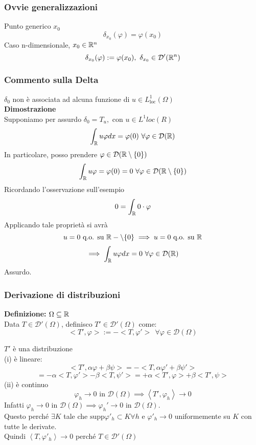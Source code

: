 \subsubsection{Ovvie generalizzazioni}
Punto generico $x_0$
\[\delta_{x_0}(\varphi)=\varphi(x_0)\]
Caso n-dimensionale, $x_0\in \mathbb{R}^n$
\[\delta_{x_0}(\varphi):=\varphi(x_0),\ \delta_{x_0}\in \mathcal D'(\R^n)\]
\subsubsection{Commento sulla Delta}
$\delta_0$ non è associata ad alcuna funzione di $u\in L^1_{\text{loc}}(\Omega)$
\\\textbf{Dimostrazione} 
\\Supponiamo per assurdo $\delta_0=T_u,$ con $u\in L^1loc(R)$
\[\int_{\R}^{} u\varphi dx=\varphi(0)\ \forall \varphi \in \mathcal D(\R)\]
In particolare, posso prendere $\varphi \in \mathcal D(\mathbb{R} \setminus \{0\} )$ 
\[\int_{\mathbb{R}}^{} u\varphi=\varphi(0)=0\ \forall \varphi\in\mathcal D(\mathbb{R}\setminus \{ 0\} )\]
Ricordando l'osservazione sull'esempio 
\[0=\int_{\mathbb{R}}^{} 0\cdot \varphi\]
Applicando tale proprietà si avrà
\[u=0\text{ q.o. su }\mathbb{R}-\setminus \{ 0\} \implies u=0\text{ q.o. su }\mathbb{R}\]
\[\implies \int_{\mathbb{R}}^{} u\varphi dx=0\ \forall \varphi \in \mathcal D(\mathbb{R})\]
Assurdo.
\subsubsection{Derivazione di distribuzioni}
\begin{tcolorbox}
\textbf{Definizione: }$\Omega \subseteq  \mathbb{R}$
\\Data $T\in \mathcal D'(\Omega)$, definisco $T' \in \mathcal D'(\Omega)$ come:
\[<T', \varphi>:=- <T,\varphi'>\ \ \forall \varphi \in \mathcal D(\Omega)\]

\end{tcolorbox}
$T'$ è una distribuzione
\\(i) è lineare:
\[<T',\alpha\varphi +\beta\psi> = -<T,\alpha \varphi'+\beta\psi '>\] \[= -\alpha <T,\varphi'>-\beta<T,\psi'> = +\alpha <T',\varphi>+\beta<T',\psi>\]
(ii) è continuo
\[\varphi_h\to 0\text{ in }\mathcal D(\Omega)\implies \left<T',\varphi_h \right>\to 0\]
Infatti $\varphi_h\to 0\text{ in }\mathcal D(\Omega)\implies\varphi_h'\to 0\text{ in }\mathcal D(\Omega)$.
\\Questo perché $\exists K$ tale che $\text{supp}\varphi'_h\subset K\forall h$ e $\varphi'_h\to 0$ uniformemente su $K$ con tutte le derivate.
\\Quindi $\left<T,\varphi'_h \right>\to 0$ perché $T\in \mathcal D'(\Omega)$
